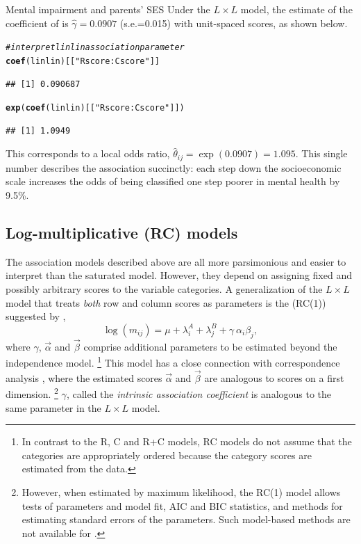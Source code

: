 \documentclass[11pt]{book}\usepackage[]{graphicx}\usepackage[]{color}
\makeatletter
\newcommand{\hlstr}[1]{\textcolor[rgb]{0.192,0.494,0.8}{#1}}%
\newcommand{\hlcom}[1]{\textcolor[rgb]{0.678,0.584,0.686}{\textit{#1}}}%
\newcommand{\hlstd}[1]{\textcolor[rgb]{0.345,0.345,0.345}{#1}}%
\newcommand{\hlkwd}[1]{\textcolor[rgb]{0.737,0.353,0.396}{\textbf{#1}}}%
\newenvironment{kframe}{%
 \def\at@end@of@kframe{}%
 \ifinner\ifhmode%
  \def\at@end@of@kframe{\end{minipage}}%
  \begin{minipage}{\columnwidth}%
 \fi\fi%
 \def\FrameCommand##1{\hskip\@totalleftmargin \hskip-\fboxsep
 \colorbox{shadecolor}{##1}\hskip-\fboxsep
     \hskip-\linewidth \hskip-\@totalleftmargin \hskip\columnwidth}%
 \MakeFramed {\advance\hsize-\width
   \@totalleftmargin\z@ \linewidth\hsize
   \@setminipage}}%
 {\par\unskip\endMakeFramed%
 \at@end@of@kframe}
\newenvironment{knitrout}{}{} %
\renewenvironment{knitrout}{\small\renewcommand{\baselinestretch}{.85}}{} %
\makeatother
\begin{document}
\begin{Example}[mental4]{Mental impairment and parents' SES}
Under the $L \times L$ model, the estimate of the coefficient of
 is $\hat{\gamma} = 0.0907$ (s.e.=0.015) with unit-spaced scores,
as shown below.
\begin{knitrout}
\color{fgcolor}\begin{kframe}
\begin{alltt}
\hlcom{# interpret linlin association parameter}
\hlkwd{coef}\hlstd{(linlin)[[}\hlstr{"Rscore:Cscore"}\hlstd{]]}
\end{alltt}
\begin{verbatim}
## [1] 0.090687
\end{verbatim}
\begin{alltt}
\hlkwd{exp}\hlstd{(}\hlkwd{coef}\hlstd{(linlin)[[}\hlstr{"Rscore:Cscore"}\hlstd{]])}
\end{alltt}
\begin{verbatim}
## [1] 1.0949
\end{verbatim}
\end{kframe}
\end{knitrout}
\noindent This corresponds to a local odds ratio, $\hat{\theta}_{ij} = \exp (0.0907) = 1.095$.
This single number describes the association succinctly:
each step down the socioeconomic scale increases the odds of being classified
one step poorer in mental health by 9.5\%.

\end{Example}

\subsection{Log-multiplicative (RC) models}\label{sec:RCmodels}

The association models described above
are all more parsimonious and easier to interpret
than the saturated model.  However, they depend on assigning fixed
and possibly arbitrary scores to the variable categories.
A generalization of the $L \times L$ model that treats \emph{both}
row and column scores as parameters is the  (RC(1))
suggested by \citet{Goodman:79},
\begin{equation}\label{eq:RC1}
\log ( m_{ij} ) = \mu  +  \lambda_i^A
+  \lambda_j^B  +  \gamma \: \alpha_i \beta_j \comma
\end{equation}
where $\gamma$, $\vec{\alpha}$ and $\vec{\beta}$ comprise
additional parameters to be estimated beyond the independence model.%
\footnote{
In contrast to the R, C and R+C models, RC models do not
assume that the categories are appropriately ordered
because the category scores are estimated from the data.
}
This model has a close connection with correspondence analysis
\citep{Goodman:85}, where the estimated scores
$\vec{\alpha}$ and $\vec{\beta}$ are analogous to \ca scores
on a first dimension.%
\footnote{
However, when estimated by maximum likelihood, the RC(1) model allows
\LR tests of parameters
and model fit, AIC and BIC statistics, and methods for estimating
standard errors of the parameters.
Such model-based methods are not available for \ca.
}
$\gamma$, called the \emph{intrinsic association coefficient}
is analogous to the same parameter in the $L \times L$ model.
\end{document}
